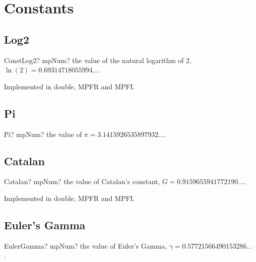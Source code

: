 \label{ElementaryFunctions} 



\section{Constants}
\label{Constants}


\subsection{Log2}

\begin{mpFunctionsExtract}
	\mpFunctionZero
	{ConstLog2? mpNum? the value of the natural logarithm of 2, $\ln(2) = 0.69314718055994...$.}
\end{mpFunctionsExtract}

Implemented in double, MPFR and MPFI.



\subsection{Pi}

\begin{mpFunctionsExtract}
	\mpFunctionZero
	{Pi? mpNum? the value of $\pi = 3.1415926535897932...$.}
\end{mpFunctionsExtract}




\subsection{Catalan}

\begin{mpFunctionsExtract}
	\mpFunctionZero
	{Catalan? mpNum? the value of Catalan's constant, $G = 0.9159655941772190...$.}
\end{mpFunctionsExtract}            

Implemented in double, MPFR and MPFI.



\subsection{Euler's Gamma}

\begin{mpFunctionsExtract}
	\mpFunctionZero
	{EulerGamma? mpNum? the value of Euler's Gamma, $\gamma = 0.57721566490153286...$.}
\end{mpFunctionsExtract}              

